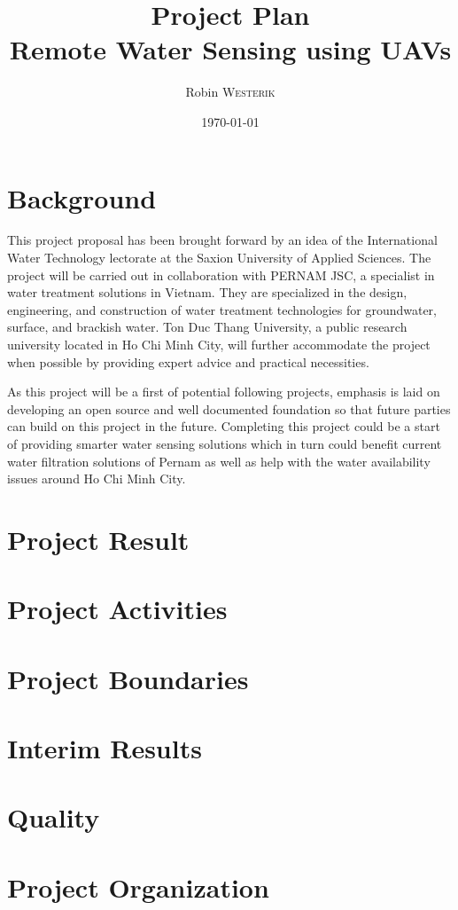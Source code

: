 \documentclass[11pt, a4paper]{article}
\title{Project Plan\\Remote Water Sensing using UAVs}
\author{Robin \textsc{Westerik}}
\date{\today}
\begin{document}


\tableofcontents
\pagebreak

\section{Background}
This project proposal has been brought forward by an idea of the International Water Technology lectorate at the Saxion University of Applied Sciences. The project will be carried out in collaboration with PERNAM JSC, a specialist in water treatment solutions in Vietnam. They are specialized in the design, engineering, and construction of water treatment technologies for groundwater, surface, and brackish water. Ton Duc Thang University, a public research university located in Ho Chi Minh City, will further accommodate the project when possible by providing expert advice and practical necessities. 

As this project will be a first of potential following projects, emphasis is laid on developing an open source and well documented foundation so that future parties can build on this project in the future. Completing this project could be a start of providing smarter water sensing solutions which in turn could benefit current water filtration solutions of Pernam as well as help with the water availability issues around Ho Chi Minh City.

\section{Project Result}

\section{Project Activities}

\section{Project Boundaries}

\section{Interim Results}

\section{Quality}

\section{Project Organization}
\end{document}
